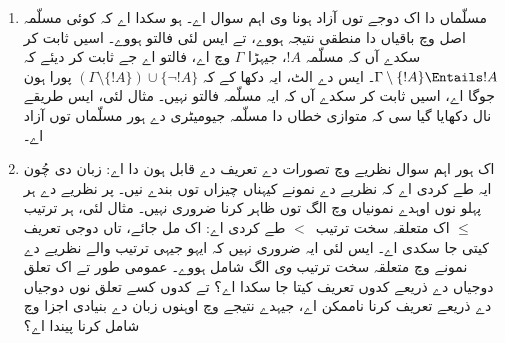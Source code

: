 \documentclass[../../../include/open-logic-section]{subfiles}
\begin{document}
\begin{explain}
\begin{enumerate}
\item مسلّماں دا اک دوجے توں آزاد ہونا وی اہم سوال اے۔ ہو سکدا
  اے کہ کوئی مسلّمہ اصل وچ باقیاں دا منطقی نتیجہ ہووے، تے ایس
  لئی فالتو ہووے۔ اسیں ثابت کر سکدے آں کہ مسلّمہ $!A$،
  جیہڑا $\Gamma$ وچ اے، فالتو اے جے ثابت کر دیئے کہ $\Gamma \setminus
  \{!A\} \Entails !A$۔ ایس دے الٹ، ایہ دکھا کے کہ
  $(\Gamma \setminus \{!A\}) \cup \{\lnot
  !A\}$ پورا ہون جوگا اے، اسیں ثابت کر سکدے آں کہ ایہ مسلّمہ
  فالتو نہیں۔ مثال لئی، ایس طریقے نال دکھایا گیا سی کہ متوازی
  خطاں دا مسلّمہ جیومیٹری دے ہور مسلّماں توں آزاد اے۔
\item اک ہور اہم سوال نظریے وچ تصورات دے تعریف دے قابل ہون
  دا اے: زبان دی چُون ایہ طے کردی اے کہ نظریے دے نمونے کیہناں
  چیزاں توں بندے نیں۔ پر نظریے دے ہر پہلو نوں اوہدے نمونیاں
  وچ الگ توں ظاہر کرنا ضروری نہیں۔ مثال لئی، ہر ترتیب
  $\le$ اک متعلقہ سخت ترتیب~$<$ طے کردی اے: اک مل جائے، تاں
  دوجی تعریف کیتی جا سکدی اے۔ ایس لئی ایہ ضروری نہیں کہ
  ایہو جیہی ترتیب والے نظریے دے نمونے وچ متعلقہ سخت ترتیب
  \emph{وی} الگ شامل ہووے۔ عمومی طور تے اک تعلق دوجیاں دے
  ذریعے کدوں تعریف کیتا جا سکدا اے؟ تے کدوں کسے تعلق نوں
  دوجیاں دے ذریعے تعریف کرنا ناممکن اے، جیہدے نتیجے وچ اوہنوں
  زبان دے بنیادی اجزا وچ شامل کرنا پیندا اے؟
\end{enumerate}
\end{explain}
\end{document}
